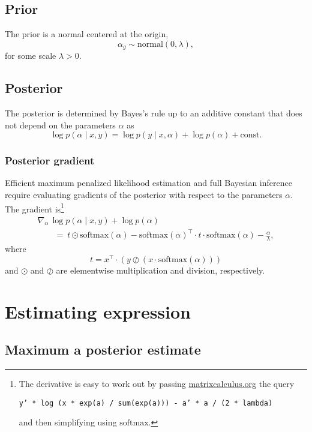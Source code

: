 \documentclass{article}
\begin{document}
\subsection{Prior}

The prior is a normal centered at the origin,
\[
  \alpha_g \sim \textrm{normal}(0, \lambda),
\]
for some scale $\lambda > 0$.


\subsection{Posterior}

The posterior is determined by Bayes's rule up to an additive constant
that does not depend on the parameters $\alpha$ as
\[
  \log p(\alpha \mid x, y) = \log p(y \mid x, \alpha) + \log p(\alpha) +
  \textrm{const.}
  \]

\subsubsection{Posterior gradient}

Efficient maximum penalized likelihood estimation and full Bayesian inference
require evaluating gradients of the posterior with respect to the parameters
$\alpha$.  The gradient is\footnote{The derivative is easy to work out
  by passing \url{matrixcalculus.org} the query
  \begin{center}\texttt{y' * log
(x * exp(a) / sum(exp(a))) - a' * a / (2 * lambda)}\end{center}
and then simplifying using $\textrm{softmax}$.}
%
\[
  \begin{array}{l}
  \nabla\!_{\alpha} \, \log p(\alpha \mid x, y) + \log p(\alpha)
  \\[4pt]
  \qquad = \
    t \odot \textrm{softmax}(\alpha)
    - \textrm{softmax}(\alpha)^{\top}\! \cdot t \cdot \textrm{softmax}(\alpha)
    - \frac{\displaystyle \alpha}{\displaystyle \lambda},
\end{array}
\]
where
\[
  t = x^{\top}\! \cdot (y \oslash (x \cdot \textrm{softmax}(\alpha)))
\]
and $\odot$ and $\oslash$ are elementwise multiplication and
division, respectively.

\section{Estimating expression}

\subsection{Maximum a posterior estimate}
\end{document}
